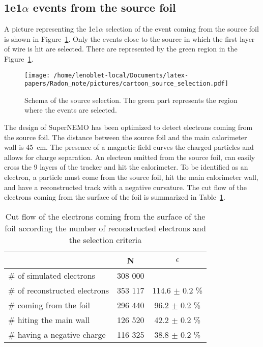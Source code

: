 \documentclass[main.tex]{subfiles}
\begin{document}
\subsection{1e1$\alpha$ events from the source foil}


\noindent A picture representing the 1e1$\alpha$ selection of the event coming from the source foil is shown in Figure~\ref{cartoon_source_selection}. Only the events close to the source in which the first layer of wire is hit are selected. There are represented by the green region in the Figure~\ref{cartoon_source_selection}.


\begin{figure}[h!]
\begin{center}
\texttt{[image: /home/lenoblet-local/Documents/latex-papers/Radon\_note/pictures/cartoon\_source\_selection.pdf]}
\caption{Schema of the source selection. The green part represents the region where the events are selected.}
\label{cartoon_source_selection}
\end{center}
\end{figure}


\noindent The design of SuperNEMO has been optimized to detect electrons coming from the source foil. The distance between the source foil and the main calorimeter wall is 45~cm. The presence of a magnetic field curves the charged particles and allows for charge separation. An electron emitted from the source foil, can easily cross the 9 layers of the tracker and hit the calorimeter. To be identified as an electron, a particle must come from the source foil, hit the main calorimeter wall, and have a reconstructed track with a negative curvature. The cut flow of the electrons coming from the surface of the foil is summarized in Table~\ref{Cutflowelectron}.


\begin{table}[h!]
\begin{center}
\begin{tabular}{l|c|c}
 & N & $\epsilon$ \\
\toprule
$\#$ of simulated electrons & 308 000 & \\
\hline
$\#$ of reconstructed electrons & 353 117 & 114.6 $\pm$ 0.2 \%\\
$\#$ coming from the foil       & 296 440 & 96.2  $\pm$ 0.2 \%\\
$\#$ hiting the main wall       & 126 520 & 42.2  $\pm$ 0.2 \%\\
$\#$ having a negative charge  & 116 325  & 38.8  $\pm$ 0.2 \%\\
\bottomrule
\end{tabular}
\end{center}
\caption{Cut flow of the electrons coming from the surface of the foil according the number of reconstructed electrons and the selection criteria}
\label{Cutflowelectron}
\end{table}
\end{document}
